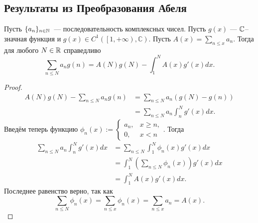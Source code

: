 \subsection{Результаты из Преобразования Абеля}
\label{subsec:I-4}

\begin{nlemma}
\label{lm:I-6}
    Пусть $\{ a_n \}_{n \in \mathbb{N}}$ --- последовательность комплексных чисел. 
    Пусть $g(x)$ --- $\mathbb{C}$--значная функция и $g(x) \in C^1\left( \left[ 1, +\infty \right), \mathbb{C} \right)$. 
    Пусть $A(x) = \sum_{n \le x} a_n$.
    Тогда для любого $N \in \mathbb{R}$ справедливо
    \[
        \sum_{n \le N} a_n g(n) = A(N)g(N) - \int_{1}^{N} A(x)g'(x)dx.
    \]
\end{nlemma}
\begin{proof}
    \begin{align*}
        A(N)g(N) - \sum_{n \le N} a_n g(n) &= \sum_{n \le N} a_n(g(N) - g(n)) \\
        &= \sum_{n \le N} a_n\int_{n}^{N} g'(x)dx.
    \end{align*}
    Введём теперь функцию $\phi_n(x) := 
    \begin{cases}
        a_n, & x \ge n, \\ 
        0, & x < n 
    \end{cases}$. Тогда
    \begin{align*}
        \sum_{n \le N} a_n\int_{n}^{N} g'(x)dx &= \sum_{n \le N} \int_{1}^{N}\phi_n(x)g'(x)dx \\
        &= \int_{1}^{N} \left( \sum_{n \le N} \phi_n(x) \right) g'(x)dx \\
        &= \int_{1}^{N} A(x)g'(x)dx.
    \end{align*}
    Последнее равенство верно, так как 
    \[
        \sum_{n \le N} \phi_n(x) =
        \sum_{n \le x} \phi_n(x) =
        \sum_{n \le x} a_n = A(x).
    \]
\end{proof}

